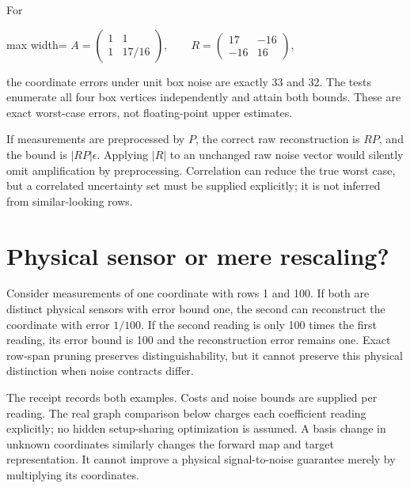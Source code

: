 \documentclass[
  11pt,
  a4paper,
]{report}
\begin{document}
For

\begin{center}
\begin{adjustbox}{max width=\linewidth}
$\displaystyle
 A=\begin{pmatrix}1&1\\1&17/16\end{pmatrix},\qquad
 R=\begin{pmatrix}17&-16\\-16&16\end{pmatrix},
$
\end{adjustbox}
\end{center}

the coordinate errors under unit box noise are exactly 33 and 32. The
tests enumerate all four box vertices independently and attain both
bounds. These are exact worst-case errors, not floating-point upper
estimates.

If measurements are preprocessed by \(P\), the correct raw
reconstruction is \(RP\), and the bound is \(|RP|\epsilon\). Applying
\(|R|\) to an unchanged raw noise vector would silently omit
amplification by preprocessing. Correlation can reduce the true worst
case, but a correlated uncertainty set must be supplied explicitly; it
is not inferred from similar-looking rows.

\hypertarget{physical-sensor-or-mere-rescaling}{%
\section{Physical sensor or mere
rescaling?}\label{physical-sensor-or-mere-rescaling}}

Consider measurements of one coordinate with rows 1 and 100. If both are
distinct physical sensors with error bound one, the second can
reconstruct the coordinate with error \(1/100\). If the second reading
is only 100 times the first reading, its error bound is 100 and the
reconstruction error remains one. Exact row-span pruning preserves
distinguishability, but it cannot preserve this physical distinction
when noise contracts differ.

The receipt records both examples. Costs and noise bounds are supplied
per reading. The real graph comparison below charges each coefficient
reading explicitly; no hidden setup-sharing optimization is assumed. A
basis change in unknown coordinates similarly changes the forward map
and target representation. It cannot improve a physical signal-to-noise
guarantee merely by multiplying its coordinates.
\end{document}
